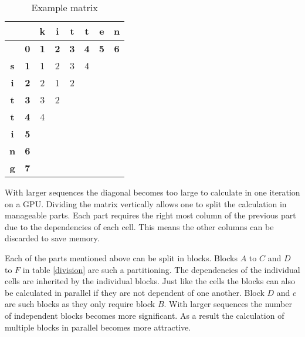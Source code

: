 {\newcommand\C[0]{\cellcolor{gray}}
\begin{table}[h]
\centering \large
\begin{tabular}{|c|c||c|c|c|c|c|c|} \hline
           &            & \textbf{k} & \textbf{i} & \textbf{t} & \textbf{t} & \textbf{e} & \textbf{n} \\ \hline
           & \textbf{0} & \textbf{1} & \textbf{2} & \textbf{3} & \textbf{4} & \textbf{5} & \textbf{6} \\ \hline \hline
\textbf{s} & \textbf{1} & 1          & 2          & 3          & 4          & \C         &            \\ \hline
\textbf{i} & \textbf{2} & 2          & 1          & 2          & \C         &            &            \\ \hline
\textbf{t} & \textbf{3} & 3          & 2          & \C         &            &            &            \\ \hline
\textbf{t} & \textbf{4} & 4          & \C         &            &            &            &            \\ \hline
\textbf{i} & \textbf{5} & \C         &            &            &            &            &            \\ \hline
\textbf{n} & \textbf{6} &            &            &            &            &            &            \\ \hline
\textbf{g} & \textbf{7} &            &            &            &            &            &            \\ \hline
\end{tabular}
\caption{Example matrix} \label{diagonal}
\end{table}
}

With larger sequences the diagonal becomes too large to calculate in one iteration on a GPU.
Dividing the matrix vertically allows one to split the calculation in manageable parts.
Each part requires the right most column of the previous part due to the dependencies of each cell.
This means the other columns can be discarded to save memory.

Each of the parts mentioned above can be split in blocks.
Blocks $A$ to $C$ and $D$ to $F$ in table \ref{division} are such a partitioning.
The dependencies of the individual cells are inherited by the individual blocks.
Just like the cells the blocks can also be calculated in parallel if they are not dependent of one another.
Block $D$ and $c$ are such blocks as they only require block $B$.
With larger sequences the number of independent blocks becomes more significant.
As a result the calculation of multiple blocks in parallel becomes more attractive.

